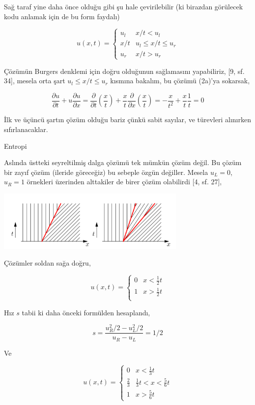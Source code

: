 \documentclass[12pt,fleqn]{article}\usepackage{../../common}
\begin{document}
Sağ taraf yine daha önce olduğu gibi şu hale çevirilebilir (ki birazdan
görülecek kodu anlamak için de bu form faydalı)

$$
u(x,t) =
\left\{ \begin{array}{ll}
u_l & x/t < u_l \\
x/t & u_l \le x/t \le u_r  \\
u_r & x/t > u_r 
\end{array} \right. 
$$

Çözümün Burgers denklemi için doğru olduğunun sağlamasını yapabiliriz, 
[9, sf. 34], mesela orta şart $u_l \le x/t \le u_r $ kısmına bakalım,
bu çözümü (2a)'ya sokarsak,

$$
\frac{\partial u}{\partial t} + u \frac{\partial u}{\partial x} =
\frac{\partial }{\partial t} \left( \frac{x}{t}  \right) +
\frac{x}{t} \frac{\partial }{\partial x} \left( \frac{x}{t}  \right) =
-\frac{x}{t^2} + \frac{x}{t} \frac{1}{t} = 0
$$

İlk ve üçüncü şartın çözüm olduğu bariz çünkü sabit sayılar, ve türevleri
alınırken sıfırlanacaklar.

Entropi

Aslında üstteki seyreltilmiş dalga çözümü tek mümkün çözüm değil. Bu çözüm bir
zayıf çözüm (ileride göreceğiz) bu sebeple özgün değiller. Mesela $u_L = 0$,
$u_R = 1$ örnekleri üzerinden alttakiler de birer çözüm olabilirdi [4, sf. 27],

\includegraphics[width=25em]{compscieng_bpp50fv1_07.png}

Çözümler soldan sağa doğru,

$$
u(x,t) =
\left\{ \begin{array}{ll}
0 & x < \frac{1}{2} t  \\
1 & x > \frac{1}{2} t  \\
\end{array} \right.
$$

Hız $s$ tabii ki daha önceki formülden hesaplandı, 

$$
s = \frac{u_R^2 / 2 - u_L^2 / 2 }{u_R - u_L} = 1/2
$$

Ve

$$
u(x,t) =
\left\{ \begin{array}{ll}
0 & x < \frac{1}{3} t  \\
\frac{2}{3} & \frac{1}{3} t < x < \frac{5}{6} t  \\
1 & x > \frac{5}{6} t  
\end{array} \right.
$$
\end{document}
